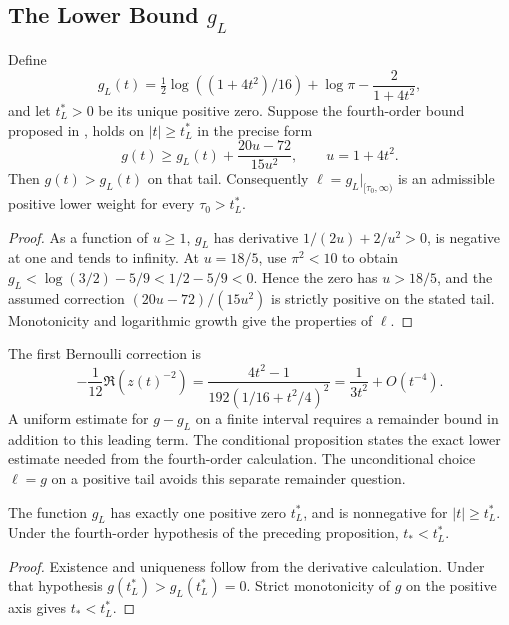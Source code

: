 \subsection{The Lower Bound \(g_{L}\)}
\label{v4-arith:w7-e:g-lower-bound}

\begin{proposition}
\label{v4-arith:w7-e:thm:g-lower-bound}
Define
\begin{equation}
\label{v4-arith:w7-e:eq:g-L-def}
 g_L(t)=\tfrac12\log((1+4t^2)/16)+\log\pi-\frac2{1+4t^2},
\end{equation}
and let $t_L^*>0$ be its unique positive zero.
Suppose the fourth-order bound proposed in
, 
holds on $|t|\ge t_L^*$ in the precise form
\[
 g(t)\ge g_L(t)+\frac{20u-72}{15u^2},\qquad u=1+4t^2.
\]
Then $g(t)>g_L(t)$ on that tail.
Consequently $\ell=g_L|_{[\tau_0,\infty)}$ is an admissible
positive lower weight for every $\tau_0>t_L^*$.
\end{proposition}
\begin{proof}
As a function of $u\ge1$, $g_L$ has derivative
$1/(2u)+2/u^2>0$, is negative at one and tends to infinity.
At $u=18/5$, use $\pi^2<10$ to obtain
$g_L<\log(3/2)-5/9<1/2-5/9<0$.
Hence the zero has $u>18/5$, and the assumed correction
$(20u-72)/(15u^2)$ is strictly positive on the stated tail.
Monotonicity and logarithmic growth give the properties of $\ell$.
\end{proof}

\begin{remark}
\label{v4-arith:w7-e:rem:quantitative-gap}
The first Bernoulli correction is
\[
 -\frac1{12}\Re(z(t)^{-2})
 =\frac{4t^2-1}{192(1/16+t^2/4)^2}
 =\frac1{3t^2}+O(t^{-4}).
\]
A uniform estimate for $g-g_L$ on a finite interval requires a
remainder bound in addition to this leading term.
The conditional proposition states the exact lower estimate needed
from the fourth-order calculation. The unconditional choice $\ell=g$
on a positive tail avoids this separate remainder question.
\end{remark}

\begin{corollary}
\label{v4-arith:w7-e:cor:g-L-zero}
The function $g_L$ has exactly one positive zero $t_L^*$, and is
nonnegative for $|t|\ge t_L^*$. Under the fourth-order hypothesis
of the preceding proposition, $t_*<t_L^*$.
\end{corollary}
\begin{proof}
Existence and uniqueness follow from the derivative calculation.
Under that hypothesis $g(t_L^*)>g_L(t_L^*)=0$.
Strict monotonicity of $g$ on the positive axis gives $t_*<t_L^*$.
\end{proof}

